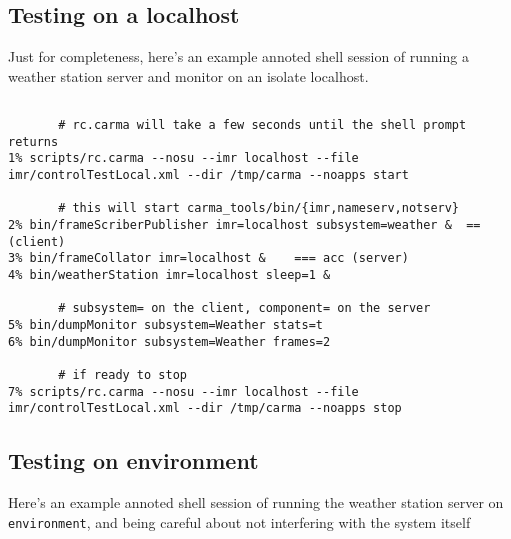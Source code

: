 \documentclass[11pt]{article}
\begin{document}
\subsection{Testing on a localhost}

Just for completeness, here's an example annoted shell session of 
running a weather station server and monitor on an isolate localhost.

\footnotesize
\begin{verbatim}

       # rc.carma will take a few seconds until the shell prompt returns
1% scripts/rc.carma --nosu --imr localhost --file imr/controlTestLocal.xml --dir /tmp/carma --noapps start

       # this will start carma_tools/bin/{imr,nameserv,notserv}
2% bin/frameScriberPublisher imr=localhost subsystem=weather &  ==  (client)
3% bin/frameCollator imr=localhost &    === acc (server)
4% bin/weatherStation imr=localhost sleep=1 &

       # subsystem= on the client, component= on the server
5% bin/dumpMonitor subsystem=Weather stats=t
6% bin/dumpMonitor subsystem=Weather frames=2

       # if ready to stop
7% scripts/rc.carma --nosu --imr localhost --file imr/controlTestLocal.xml --dir /tmp/carma --noapps stop

\end{verbatim}
\footnotesize

\subsection{Testing on environment}

Here's an example annoted shell session of running the weather station server on {\tt environment},
and being careful about not interfering with the system itself 
\end{document}
